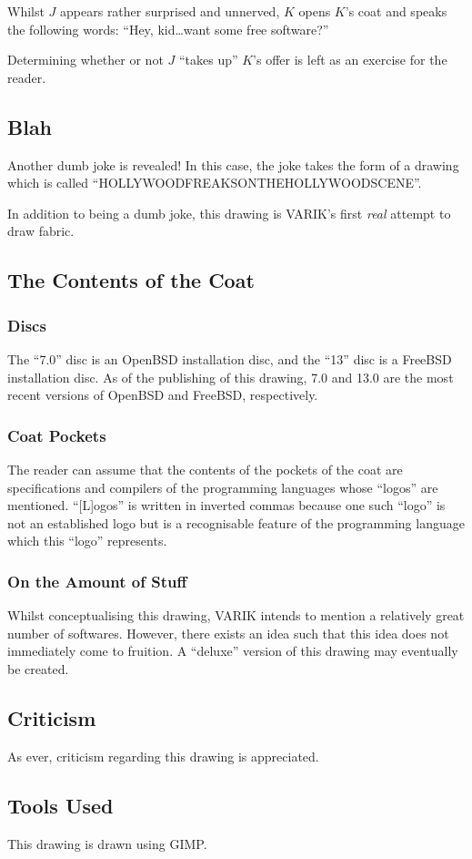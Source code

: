 \documentclass{report}
\begin{document}
Whilst $J$ appears rather surprised and unnerved, $K$ opens $K$'s coat and speaks the following words: ``Hey, kid\ldots want some free software?''

Determining whether or not $J$ ``takes up'' $K$'s offer is left as an exercise for the reader.
\subsection{Blah}
Another dumb joke is revealed!  In this case, the joke takes the form of a drawing which is called ``HOLLYWOODFREAKSONTHEHOLLYWOODSCENE''.

In addition to being a dumb joke, this drawing is VARIK's first \textit{real} attempt to draw fabric.
\subsection{The Contents of the Coat}
\subsubsection{Discs}
The ``7.0'' disc is an OpenBSD installation disc, and the ``13'' disc is a FreeBSD installation disc.  As of the publishing of this drawing, 7.0 and 13.0 are the most recent versions of OpenBSD and FreeBSD, respectively.
\subsubsection{Coat Pockets}
The reader can assume that the contents of the pockets of the coat are specifications and compilers of the programming languages whose ``logos'' are mentioned.  ``[L]ogos'' is written in inverted commas because one such ``logo'' is not an established logo but is a recognisable feature of the programming language which this ``logo'' represents.
\subsubsection{On the Amount of Stuff}
Whilst conceptualising this drawing, VARIK intends to mention a relatively great number of softwares.  However, there exists an idea such that this idea does not immediately come to fruition.  A ``deluxe'' version of this drawing may eventually be created.
\subsection{Criticism}
As ever, criticism regarding this drawing is appreciated.
\subsection{Tools Used}
This drawing is drawn using GIMP.
\end{document}

